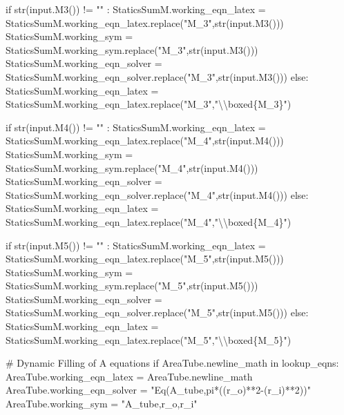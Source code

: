 \documentclass[
  letterpaper,
  DIV=11,
  numbers=noendperiod]{scrreprt}
\newenvironment{Shaded}{\begin{snugshade}}{\end{snugshade}}
\newcommand{\NormalTok}[1]{\textcolor[rgb]{0.00,0.23,0.31}{#1}}
\begin{document}
\begin{Shaded}
\begin{Highlighting}[]
\NormalTok{            if str(input.M3()) != "" : }
\NormalTok{                StaticsSumM.working\_eqn\_latex = StaticsSumM.working\_eqn\_latex.replace("M\_3",str(input.M3()))}
\NormalTok{                StaticsSumM.working\_sym = StaticsSumM.working\_sym.replace("M\_3",str(input.M3()))}
\NormalTok{                StaticsSumM.working\_eqn\_solver = StaticsSumM.working\_eqn\_solver.replace("M\_3",str(input.M3()))}
\NormalTok{            else:}
\NormalTok{                StaticsSumM.working\_eqn\_latex = StaticsSumM.working\_eqn\_latex.replace("M\_3","\textbackslash{}\textbackslash{}boxed\{M\_3\}")}
        
\NormalTok{            if str(input.M4()) != "" : }
\NormalTok{                StaticsSumM.working\_eqn\_latex = StaticsSumM.working\_eqn\_latex.replace("M\_4",str(input.M4()))}
\NormalTok{                StaticsSumM.working\_sym = StaticsSumM.working\_sym.replace("M\_4",str(input.M4()))}
\NormalTok{                StaticsSumM.working\_eqn\_solver = StaticsSumM.working\_eqn\_solver.replace("M\_4",str(input.M4()))}
\NormalTok{            else:}
\NormalTok{                StaticsSumM.working\_eqn\_latex = StaticsSumM.working\_eqn\_latex.replace("M\_4","\textbackslash{}\textbackslash{}boxed\{M\_4\}")}
        
\NormalTok{            if str(input.M5()) != "" : }
\NormalTok{                StaticsSumM.working\_eqn\_latex = StaticsSumM.working\_eqn\_latex.replace("M\_5",str(input.M5()))}
\NormalTok{                StaticsSumM.working\_sym = StaticsSumM.working\_sym.replace("M\_5",str(input.M5()))}
\NormalTok{                StaticsSumM.working\_eqn\_solver = StaticsSumM.working\_eqn\_solver.replace("M\_5",str(input.M5()))}
\NormalTok{            else:}
\NormalTok{                StaticsSumM.working\_eqn\_latex = StaticsSumM.working\_eqn\_latex.replace("M\_5","\textbackslash{}\textbackslash{}boxed\{M\_5\}")}
          
        
\NormalTok{        \# Dynamic Filling of A equations }
\NormalTok{        if AreaTube.newline\_math in lookup\_eqns:}
\NormalTok{            AreaTube.working\_eqn\_latex = AreaTube.newline\_math}
\NormalTok{            AreaTube.working\_eqn\_solver = "Eq(A\_tube,pi*((r\_o)**2{-}(r\_i)**2))"}
\NormalTok{            AreaTube.working\_sym = "A\_tube,r\_o,r\_i"}
            

\end{Highlighting}
\end{Shaded}
\end{document}
